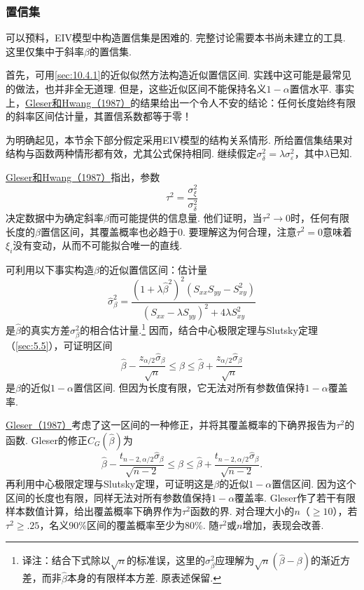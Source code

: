 \subsubsection{置信集}\label{sec:12.2.4}
可以预料，EIV模型中构造置信集是困难的. 完整讨论需要本书尚未建立的工具. 这里仅集中于斜率$\beta$的置信集.

首先，可用\autoref{sec:10.4.1}的近似似然方法构造近似置信区间. 实践中这可能是最常见的做法，也并非全无道理. 但是，这些近似区间不能保持名义$1-\alpha$置信水平. 事实上，\hyperref[bib:source150]{Gleser和Hwang（1987）}的结果给出一个令人不安的结论：任何长度始终有限的斜率区间估计量，其置信系数都等于零！

为明确起见，本节余下部分假定采用EIV模型的结构关系情形. 所给置信集结果对结构与函数两种情形都有效，尤其公式保持相同. 继续假定$\sigma_\delta^2=\lambda\sigma_\varepsilon^2$，其中$\lambda$已知.

\hyperref[bib:source150]{Gleser和Hwang（1987）}指出，参数
$$\tau^2=\frac{\sigma_\xi^2}{\sigma_\delta^2}$$
决定数据中为确定斜率$\beta$而可能提供的信息量. 他们证明，当$\tau^2\to0$时，任何有限长度的$\beta$置信区间，其覆盖概率也必趋于0. 要理解这为何合理，注意$\tau^2=0$意味着$\xi_i$没有变动，从而不可能拟合唯一的直线.

可利用以下事实构造$\beta$的近似置信区间：估计量
$$\hat\sigma_\beta^2=\frac{(1+\lambda\hat\beta^2)^2(S_{xx}S_{yy}-S_{xy}^2)}{(S_{xx}-\lambda S_{yy})^2+4\lambda S_{xy}^2}$$
是$\hat\beta$的真实方差$\sigma_\beta^2$的相合估计量.\footnote{译注：结合下式除以$\sqrt n$的标准误，这里的$\sigma_\beta^2$应理解为$\sqrt n(\hat\beta-\beta)$的渐近方差，而非$\hat\beta$本身的有限样本方差. 原表述保留.} 因而，结合中心极限定理与Slutsky定理（\autoref{sec:5.5}），可证明区间
$$\hat\beta-\frac{z_{\alpha/2}\hat\sigma_\beta}{\sqrt n}\le\beta\le
\hat\beta+\frac{z_{\alpha/2}\hat\sigma_\beta}{\sqrt n}$$
是$\beta$的近似$1-\alpha$置信区间. 但因为长度有限，它无法对所有参数值保持$1-\alpha$覆盖率.

\hyperref[bib:source145]{Gleser（1987）}考虑了这一区间的一种修正，并将其覆盖概率的下确界报告为$\tau^2$的函数. Gleser的修正$C_G(\hat\beta)$为
\begin{equation}\label{eq:12.2.22}
\hat\beta-\frac{t_{n-2,\alpha/2}\hat\sigma_\beta}{\sqrt{n-2}}\le\beta\le
\hat\beta+\frac{t_{n-2,\alpha/2}\hat\sigma_\beta}{\sqrt{n-2}}.
\end{equation}
再利用中心极限定理与Slutsky定理，可证明这是$\beta$的近似$1-\alpha$置信区间. 因为这个区间的长度也有限，同样无法对所有参数值保持$1-\alpha$覆盖率. Gleser作了若干有限样本数值计算，给出覆盖概率下确界作为$\tau^2$函数的界. 对合理大小的$n$（$\ge10$），若$\tau^2\ge.25$，名义90\%区间的覆盖概率至少为80\%. 随$\tau^2$或$n$增加，表现会改善.

